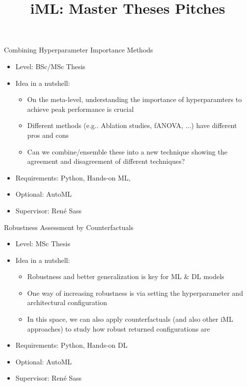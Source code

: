 \documentclass[aspectratio=169]{../latex_main/tntbeamer}  %
\title[Conclusion]{iML: Master Theses Pitches}
\subtitle{}
\begin{document}
	
	\maketitle



\begin{frame}[c]{Combining Hyperparameter Importance Methods}
 
	\begin{itemize}
		\item Level: BSc/MSc Thesis
		\item Idea in a nutshell:
		\begin{itemize}
		    \item On the meta-level, understanding the importance of hyperparamters to achieve peak performance is crucial
		    \item Different methods (e.g.. Ablation studies, fANOVA, ...) have different pros and cons 
		    \item Can we combine/ensemble these into a new technique showing the agreement and disagreement of different techniques? 
		\end{itemize}
		\item Requirements: Python, Hands-on ML, 
		\item Optional: AutoML
		\item Supervisor: Ren\'e Sass
	\end{itemize}
\end{frame}

\begin{frame}[c]{Robustness Assessment by Counterfactuals}
 
	\begin{itemize}
		\item Level: MSc Thesis
		\item Idea in a nutshell:
		\begin{itemize}
		    \item Robustness and better generalization is key for ML \& DL models
		    \item One way of increasing robustness is via setting the hyperparameter and architectural configuration
		    \item In this space, we can also apply counterfactuals (and also other iML approaches) to study how robust returned configurations are
		\end{itemize}
		\item Requirements: Python, Hands-on DL
		\item Optional: AutoML
		\item Supervisor: Ren\'e Sass
	\end{itemize}
\end{frame}
\end{document}
